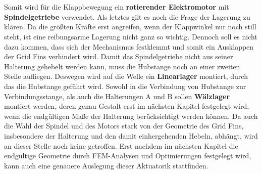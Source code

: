 \\~\\
Somit wird für die Klappbewegung ein \textbf{rotierender Elektromotor} mit \textbf{Spindelgetriebe} verwendet. Als letztes gilt es noch die Frage der Lagerung zu klären. Da die größten Kräfte erst angreifen, wenn der Klappwinkel nur noch still steht, ist eine reibungsarme Lagerung nicht ganz so wichtig. Dennoch soll es nicht dazu kommen, dass sich der Mechanismus festklemmt und somit ein Ausklappen der Grid Fins verhindert wird. Damit das Spindelgetriebe nicht aus seiner Halterung gehebelt werden kann, muss die Hubstange noch an einer zweiten Stelle aufliegen. Deswegen wird auf die Welle ein \textbf{Linearlager} montiert, durch das die Hubstange geführt wird. Sowohl in die Verbindung von Hubstange zur Verbindungsstange, als auch die Halterungen A und B sollen \textbf{Wälzlager} montiert werden, deren genau Gestalt erst im nächsten Kapitel festgelegt wird, wenn die endgültigen Maße der Halterung berücksichtigt werden können.
Da auch die Wahl der Spindel und des Motors stark von der Geometrie des Grid Fins, insbesondere der Halterung und den damit einhergehenden Hebeln, abhängt, wird an dieser Stelle noch keine getroffen. Erst nachdem im nächsten Kapitel die endgültige Geometrie durch FEM-Analysen und Optimierungen festgelegt wird, kann auch eine genauere Auslegung dieser Aktuatorik stattfinden.
